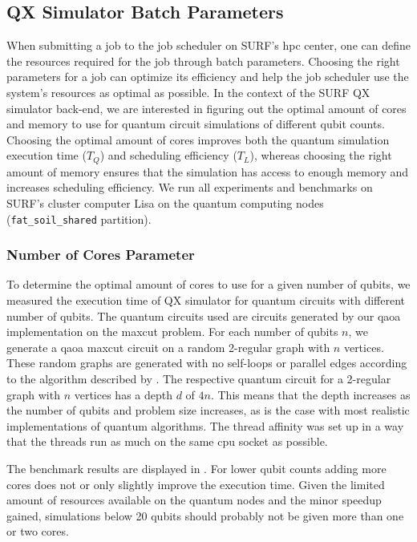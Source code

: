 \subsection{QX Simulator Batch Parameters}
When submitting a job to the job scheduler on SURF's \gls{hpc} center, one can define the resources required for the job through batch parameters.
Choosing the right parameters for a job can optimize its efficiency and help the job scheduler use the system's resources as optimal as possible.
In the context of the SURF QX simulator back-end, we are interested in figuring out the optimal amount of cores and memory to use for quantum circuit simulations of different qubit counts.
Choosing the optimal amount of cores improves both the quantum simulation execution time ($T_Q$) and scheduling efficiency ($T_L$), whereas choosing the right amount of memory ensures that the simulation has access to enough memory and increases scheduling efficiency.
We run all experiments and benchmarks on SURF's cluster computer Lisa on the quantum computing nodes (\texttt{fat_soil_shared} partition).

\subsubsection{Number of Cores Parameter}
To determine the optimal amount of cores to use for a given number of qubits, we measured the execution time of QX simulator for quantum circuits with different number of qubits.
The quantum circuits used are circuits generated by our \gls{qaoa} implementation on the \gls{maxcut} problem.
For each number of qubits $n$, we generate a \gls{qaoa} \gls{maxcut} circuit on a random 2-regular graph with $n$ vertices.
These random graphs are generated with no self-loops or parallel edges according to the algorithm described by \textcite{steger1999generating}.
The respective quantum circuit for a 2-regular graph with $n$ vertices has a depth $d$ of $4n$.
This means that the depth increases as the number of qubits and problem size increases, as is the case with most realistic implementations of quantum algorithms.
The thread affinity was set up in a way that the threads run as much on the same \gls{cpu} socket as possible.

The benchmark results are displayed in .
For lower qubit counts adding more cores does not or only slightly improve the execution time.
Given the limited amount of resources available on the quantum nodes and the minor speedup gained, simulations below 20 qubits should probably not be given more than one or two cores.

